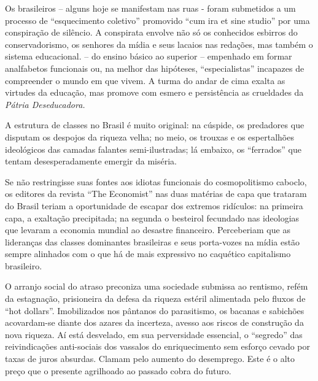 Os brasileiros -- alguns hoje se manifestam nas ruas - foram submetidos
a um processo de ``esquecimento coletivo'' promovido ``cum ira et sine
studio'' por uma conspiração de silêncio. A conspirata envolve não só os
conhecidos esbirros do conservadorismo, os senhores da mídia e seus
lacaios nas redações, mas também o sistema educacional. -- do ensino
básico ao superior -- empenhado em formar analfabetos funcionais ou, na
melhor das hipóteses, ``especialistas'' incapazes de compreender o mundo
em que vivem. A turma do andar de cima exalta as virtudes da educação,
mas promove com esmero e persistência as crueldades da \emph{Pátria
Deseducadora.}

A estrutura de classes no Brasil é muito original: na cúspide, os
predadores que disputam os despojos da riqueza velha; no meio, os
trouxas e os espertalhões ideológicos das camadas falantes
semi-ilustradas; lá embaixo, os ``ferrados'' que tentam desesperadamente
emergir da miséria.

Se não restringisse suas fontes aos idiotas funcionais do cosmopolitismo
caboclo, os editores da revista ``The Economist'' nas duas matérias de
capa que trataram do Brasil teriam a oportunidade de escapar dos
extremos ridículos: na primeira capa, a exaltação precipitada; na
segunda o besteirol fecundado nas ideologias que levaram a economia
mundial ao desastre financeiro. Perceberiam que as lideranças das
classes dominantes brasileiras e seus porta-vozes na mídia estão sempre
alinhados com o que há de mais expressivo no caquético capitalismo
brasileiro.

O arranjo social do atraso preconiza uma sociedade submissa ao rentismo,
refém da estagnação, prisioneira da defesa da riqueza estéril alimentada
pelo fluxos de ``hot dollars''. Imobilizados nos pântanos do
parasitismo, os bacanas e sabichões acovardam-se diante dos azares da
incerteza, avesso aos riscos de construção da nova riqueza. Aí está
desvelado, em sua perversidade essencial, o ``segredo'' das
reivindicações anti-sociais dos vassalos do enriquecimento sem esforço
cevado por taxas de juros absurdas. Clamam pelo aumento do desemprego.
Este é o alto preço que o presente agrilhoado ao passado cobra do
futuro.
